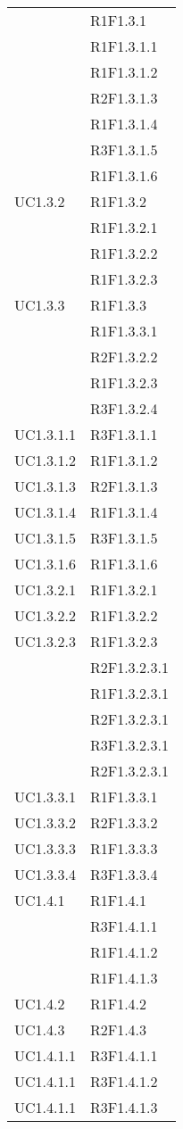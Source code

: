\begin{longtable}{|>{\centering}m{5cm}|m{5cm}<{\centering}|}
{UC1.3.1}&{R1F1.3.1}\\
&{R1F1.3.1.1}\\
&{R1F1.3.1.2}\\
&{R2F1.3.1.3}\\
&{R1F1.3.1.4}\\
&{R3F1.3.1.5}\\
&{R1F1.3.1.6}\\ \hline
{UC1.3.2}&{R1F1.3.2}\\
&{R1F1.3.2.1}\\
&{R1F1.3.2.2}\\
&{R1F1.3.2.3}\\ \hline
{UC1.3.3}&{R1F1.3.3}\\
&{R1F1.3.3.1}\\
&{R2F1.3.2.2}\\
&{R1F1.3.2.3}\\
&{R3F1.3.2.4}\\ \hline
{UC1.3.1.1}&{R3F1.3.1.1}\\ \hline
{UC1.3.1.2}&{R1F1.3.1.2}\\ \hline
{UC1.3.1.3}&{R2F1.3.1.3}\\ \hline
{UC1.3.1.4}&{R1F1.3.1.4}\\ \hline
{UC1.3.1.5}&{R3F1.3.1.5}\\ \hline
{UC1.3.1.6}&{R1F1.3.1.6}\\ \hline
{UC1.3.2.1}&{R1F1.3.2.1}\\ \hline
{UC1.3.2.2}&{R1F1.3.2.2}\\ \hline
{UC1.3.2.3}&{R1F1.3.2.3}\\
&{R2F1.3.2.3.1}\\
&{R1F1.3.2.3.1}\\
&{R2F1.3.2.3.1}\\
&{R3F1.3.2.3.1}\\
&{R2F1.3.2.3.1}\\ \hline
{UC1.3.3.1}&{R1F1.3.3.1}\\ \hline
{UC1.3.3.2}&{R2F1.3.3.2}\\ \hline
{UC1.3.3.3}&{R1F1.3.3.3}\\ \hline
{UC1.3.3.4}&{R3F1.3.3.4}\\ \hline

{UC1.4.1}&{R1F1.4.1}\\
&{R3F1.4.1.1}\\
&{R1F1.4.1.2}\\
&{R1F1.4.1.3}\\ \hline
{UC1.4.2}&{R1F1.4.2}\\ \hline
{UC1.4.3}&{R2F1.4.3}\\ \hline
{UC1.4.1.1}&{R3F1.4.1.1}\\ \hline
{UC1.4.1.1}&{R3F1.4.1.2}\\ \hline
{UC1.4.1.1}&{R3F1.4.1.3}\\ \hline


\end{longtable}
